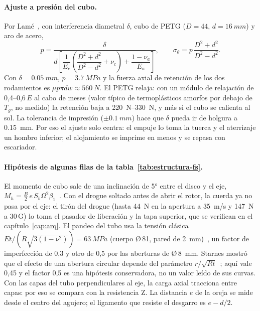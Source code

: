 \paragraph{Ajuste a presión del cubo.} Por Lamé~\cite{budynas2015}, con interferencia
diametral $\delta$, cubo de PETG ($D=44$, $d=\SI{16}{mm}$) y aro de acero,
\begin{equation}
  p=\frac{\delta}{d\left[\dfrac{1}{E_c}\left(\dfrac{D^2+d^2}{D^2-d^2}+\nu_c\right)+\dfrac{1-\nu_a}{E_a}\right]},
  \qquad \sigma_\theta=p\,\frac{D^2+d^2}{D^2-d^2}.
  \label{eq:estructura-lame}
\end{equation}
Con $\delta=\SI{0.05}{mm}$, $p=\SI{3.7}{MPa}$ y la fuerza axial de retención de los dos
rodamientos es $\mu p\pi d w\approx\SI{560}{N}$. El PETG relaja: con un módulo de
relajación de 0,4--0,6\,$E$ al cabo de meses (valor típico de termoplásticos amorfos por
debajo de $T_g$, no medido) la retención baja a \SIrange{220}{330}{N}, y más si el cubo se
calienta al sol. La tolerancia de impresión ($\pm\SI{0.1}{mm}$) hace que $\delta$ pueda ir
de holgura a \SI{0.15}{mm}. Por eso el ajuste solo centra: el empuje lo toma la tuerca y
el aterrizaje un hombro inferior; el alojamiento se imprime en menos y se repasa con
escariador.

\paragraph{Hipótesis de algunas filas de la tabla~\ref{tab:estructura-fs}.} El momento
de cubo sale de una inclinación de \ang{5} entre el disco y el eje,
$M_h=\frac B2\,e\,S_b\Omega^2\beta_1$~\cite{johnson1980}. Con el drogue soltado
antes de abrir el rotor, la cuerda ya no pasa por el eje: el tirón del drogue (hasta
\SI{44}{N} en la apertura a \SI{35}{m/s} y \SI{147}{N} a 30\,G) lo toma el pasador de
liberación y la tapa superior, que se verifican en el capítulo~\ref{cap:arq}. El pandeo
del tubo usa la tensión clásica $Et/(R\sqrt{3(1-\nu^2)})=\SI{63}{MPa}$ (cuerpo Ø\,81,
pared de \SI{2}{mm})~\cite{timoshenko1961}, un factor de imperfección de
0,3 y otro de 0,5 por las aberturas de Ø\,\SI{8}{mm}. Starnes mostró que el efecto de una
abertura circular depende del parámetro $r/\sqrt{Rt}$~\cite{estructura-starnes1970}; aquí
vale 0,45 y el factor 0,5 es una hipótesis conservadora, no un valor leído de sus curvas.
Con las capas del tubo perpendiculares al eje, la carga axial tracciona entre capas: por
eso se compara con la resistencia Z. La distancia $e$ de la oreja se mide desde el centro
del agujero; el ligamento que resiste el desgarro es $e-d/2$.

